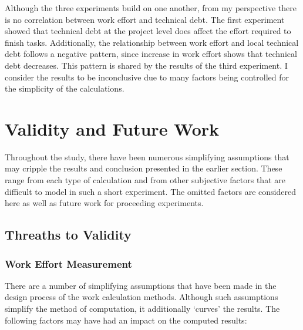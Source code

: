 \documentclass{mpaper}
\begin{document}
Although the three experiments build on one another, from my perspective there
is no correlation between work effort and technical debt. The first experiment
showed that technical debt at the project level does affect the effort required
to finish tasks. Additionally, the relationship between work effort and local
technical debt follows a negative pattern, since increase in work effort shows
that technical debt decreases. This pattern is shared by the results of the
third experiment. I consider the results to be inconclusive due to many factors
being controlled for the simplicity of the calculations.

\section{Validity and Future Work}
\label{validity-future-work}

Throughout the study, there have been numerous simplifying assumptions that may
cripple the results and conclusion presented in the earlier section. These range
from each type of calculation and from other subjective factors that are
difficult to model in such a short experiment. The omitted factors are
considered here as well as future work for proceeding experiments.

\subsection{Threaths to Validity}
\label{validity}

\subsubsection*{Work Effort Measurement}
\label{validity-work}

There are a number of simplifying assumptions that have been made in the design
process of the work calculation methods. Although such assumptions simplify the
method of computation, it additionally `curves' the results. The following
factors may have had an impact on the computed results:
\end{document}
